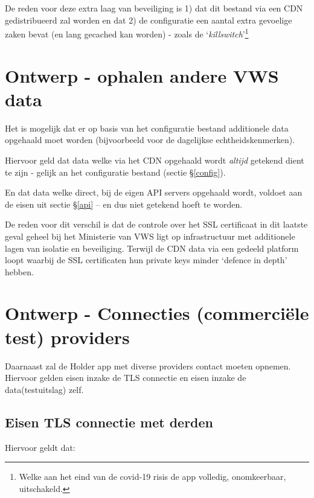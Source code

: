 \documentclass[11.0pt,twoside,openright]{report}
\begin{document}
De reden voor deze extra laag van beveiliging is 1) dat dit bestand via een CDN gedistribueerd zal worden en dat 2) de configuratie een aantal extra gevoelige zaken bevat (en lang gecached kan worden) - zoals de `\emph{killswitch}'\footnote{Welke aan het eind van de covid-19 risis de app volledig, onomkeerbaar, uitschakeld.}

\section{Ontwerp - ophalen andere VWS data}

Het is mogelijk dat er op basis van het configuratie bestand additionele data opgehaald moet worden (bijvoorbeeld voor de dagelijkse echtheidskenmerken).

Hiervoor geld dat data welke via het CDN opgehaald wordt \emph{altijd} getekend dient te zijn - gelijk an het configuratie bestand (sectie \S\ref{config}).

En dat data welke direct, bij de eigen API servers opgehaald wordt, voldoet aan de eisen uit sectie \S\ref{api} -- en dus niet getekend hoeft te worden.

De reden voor dit verschil is dat de controle over het SSL certificaat in dit laatste geval geheel bij het Ministerie van VWS ligt op infrastructuur met additionele lagen van isolatie en beveiliging. Terwijl de CDN data via een gedeeld platform loopt waarbij de SSL certificaten hun private keys minder `defence in depth' hebben.

\fi
\pagebreak
\section{Ontwerp - Connecties (commerciële test) providers}

Daarnaast zal de Holder app met diverse providers contact moeten opnemen. Hiervoor gelden eisen inzake de TLS connectie en eisen inzake de data(testuitslag) zelf.

\subsection{Eisen TLS connectie met derden}

Hiervoor geldt dat:
\end{document}
